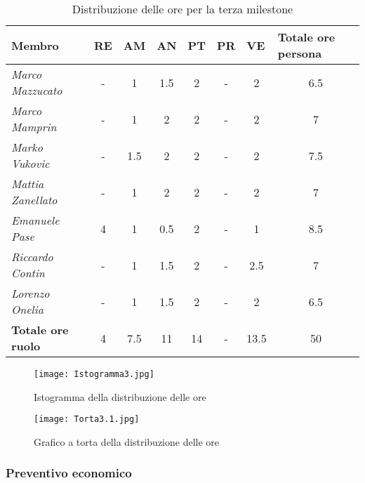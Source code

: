 \begin{table}[H]
    \centering
    \begin{tabular}{|l|c|c|c|c|c|c|c|}
    \hline
    \textbf{Membro} & \multicolumn{1}{l|}{\textbf{RE}} & \multicolumn{1}{l|}{\textbf{AM}} & \multicolumn{1}{l|}{\textbf{AN}} & \multicolumn{1}{l|}{\textbf{PT}} & \multicolumn{1}{l|}{\textbf{PR}} & \multicolumn{1}{l|}{\textbf{VE}} & \multicolumn{1}{l|}{\textbf{Totale ore persona}} \\ \hline
    \textit{Marco Mazzucato}  & - & 1   & 1.5 & 2 & -  & 2    & 6.5  \\ \hline
    \textit{Marco Mamprin}    & - & 1   & 2   & 2 & -  & 2    & 7    \\ \hline
    \textit{Marko Vukovic}    & - & 1.5 & 2   & 2 & -  & 2    & 7.5  \\ \hline
    \textit{Mattia Zanellato} & - & 1   & 2   & 2 & -  & 2    & 7    \\ \hline
    \textit{Emanuele Pase}    & 4 & 1   & 0.5 & 2 & -  & 1    & 8.5  \\ \hline
    \textit{Riccardo Contin}  & - & 1   & 1.5 & 2 & -  & 2.5  & 7    \\ \hline
    \textit{Lorenzo Onelia}   & - & 1   & 1.5 & 2 & -  & 2    & 6.5  \\ \hline
    \textbf{Totale ore ruolo} & 4 & 7.5 & 11  & 14& - & 13.5 & 50   \\ \hline
    \end{tabular}
    \caption{Distribuzione delle ore per la terza milestone}
\end{table}

\begin{figure}[H]
    \texttt{[image: Istogramma3.jpg]}
    \caption{Istogramma della distribuzione delle ore} 
\end{figure}

\begin{figure}[H]
    \texttt{[image: Torta3.1.jpg]}
    \caption{Grafico a torta della distribuzione delle ore} 
\end{figure}

\newpage
\subsubsection{Preventivo economico}

